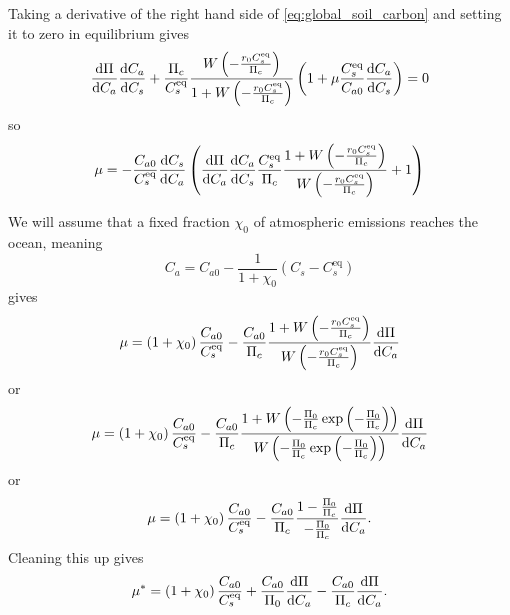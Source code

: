 Taking a derivative of the right hand side of \cref{eq:global_soil_carbon} and setting it to zero in equilibrium gives
\begin{equation}
  \label{eq:soil_carbon_lambda}
  \dv{\Pi}{C_a}\dv{C_a}{C_s} + \frac{\Pi_c}{C_s^{\mathrm{eq}}} \frac{W\left(-\frac{r_0C_s^{\mathrm{eq}}}{\Pi_c}\right)}{1+W\left(-\frac{r_0C_s^{\mathrm{eq}}}{\Pi_c}\right)} \left(
    1 + \mu \frac{C_s^{\mathrm{eq}}}{C_{a0}} \dv{C_a}{C_s}\right) = 0
\end{equation}
so
\begin{equation}
  \label{eq:critical_mu}
  \mu = -\frac{C_{a0}}{C_{s}^{\mathrm{eq}}}\dv{C_s}{C_a}\left(\dv{\Pi}{C_a}\dv{C_a}{C_s} \frac{C_s^{\mathrm{eq}}}{\Pi_c}\frac{1+W\left(-\frac{r_0C_s^{\mathrm{eq}}}{\Pi_c}\right)}{W\left(-\frac{r_0C_s^{\mathrm{eq}}}{\Pi_c}\right)} + 1 \right)
\end{equation}

We will assume  that a fixed fraction $\chi_0$ of atmospheric emissions reaches the ocean, meaning
\begin{equation}
  \label{eq:simple_ocean}
  C_a = C_{a0} -\frac{1}{1+\chi_0} (C_s - C_{s}^{\mathrm{eq}})
\end{equation}
gives
\begin{equation}
  \label{eq:critical_mu_simple_ocean}
  \mu = \left(1+\chi_0\right) \frac{C_{a0}}{C_{s}^{\mathrm{eq}}} -
  \frac{C_{a0}}{\Pi_c}\frac{1+W\left(-\frac{r_0C_s^{\mathrm{eq}}}{\Pi_c}\right)}{W\left(-\frac{r_0C_s^{\mathrm{eq}}}{\Pi_c}\right)}\dv{\Pi}{C_a}
\end{equation}
or
\begin{equation*}
  \mu = \left(1+\chi_0\right) \frac{C_{a0}}{C_{s}^{\mathrm{eq}}} -
  \frac{C_{a0}}{\Pi_c}
  \frac{1+W\left(-\frac{\Pi_0}{\Pi_c}\exp\left(-\frac{\Pi_0}{\Pi_c}\right)\right)}
  {W\left(-\frac{\Pi_0}{\Pi_c}\exp\left(-\frac{\Pi_0}{\Pi_c}\right)\right)}\dv{\Pi}{C_a} 
\end{equation*}
or
\begin{equation*}
  \mu = \left(1+\chi_0\right) \frac{C_{a0}}{C_{s}^{\mathrm{eq}}} -
  \frac{C_{a0}}{\Pi_c}
  \frac{1-\frac{\Pi_0}{\Pi_c}}{-\frac{\Pi_0}{\Pi_c}}\dv{\Pi}{C_a} .
\end{equation*}
Cleaning this up gives
\begin{equation}
  \label{eq:critical_mu_simple_ocean_in_terms_of_npp}
  \mu^* = \left(1+\chi_0\right) \frac{C_{a0}}{C_{s}^{\mathrm{eq}}} +
  \frac{C_{a0}}{\Pi_0} \dv{\Pi}{C_a} - \frac{C_{a0}}{\Pi_c}\dv{\Pi}{C_a}.
\end{equation}

